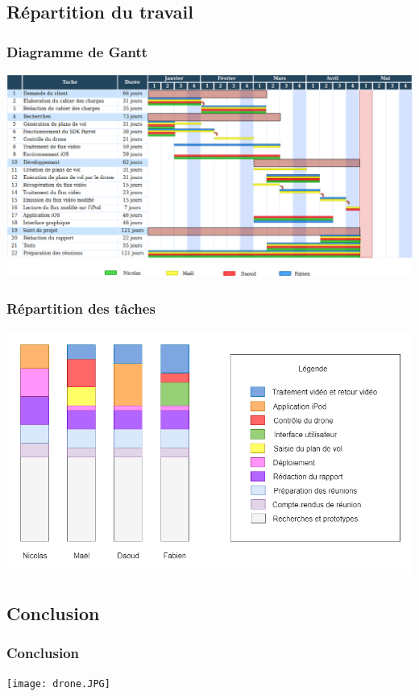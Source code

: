\documentclass{beamer}
\begin{document}
	
	\begin{frame}
		\section{Répartition du travail}
		\begin{center}
		\frametitle{Diagramme de Gantt}
        \includegraphics[scale=0.28]{gantt_v2.png}
		\end{center}
	\end{frame}

	
	\begin{frame}
		\begin{center}
		\frametitle{Répartition des tâches}
        \includegraphics[scale=0.3]{repartition_taches.png}
		\end{center}
	\end{frame}

	
	\begin{frame}
	    \section{Conclusion}
		\begin{center}
		\frametitle{Conclusion}
		\texttt{[image: drone.JPG]}
		\end{center}
	\end{frame}



	
\end{document}
